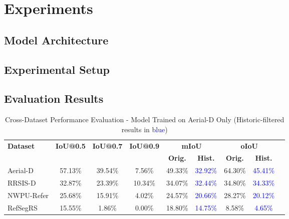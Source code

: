
\section{Experiments}
\label{sec:experiments}

\subsection{Model Architecture}
\label{subsec:model_architecture}

\subsection{Experimental Setup}
\label{subsec:experimental_setup}

\subsection{Evaluation Results}
\label{subsec:evaluation_results}

\begin{table*}[t]
\centering
\caption{Cross-Dataset Performance Evaluation - Model Trained on Aerial-D Only (Historic-filtered results in \textcolor{blue}{blue})}
\label{tab:cross_dataset_results}
\begin{tabular}{@{}lcccccccc@{}}
\toprule
\textbf{Dataset} & \textbf{IoU@0.5} & \textbf{IoU@0.7} & \textbf{IoU@0.9} & \multicolumn{2}{c}{\textbf{mIoU}} & \multicolumn{2}{c}{\textbf{oIoU}} \\
\cmidrule(lr){5-6} \cmidrule(lr){7-8}
 & & & & \textbf{Orig.} & \textbf{Hist.} & \textbf{Orig.} & \textbf{Hist.} \\
\midrule
Aerial-D & 57.13\% & 39.54\% & 7.56\% & 49.33\% & \textcolor{blue}{32.92\%} & 64.30\% & \textcolor{blue}{45.41\%} \\
RRSIS-D & 32.87\% & 23.39\% & 10.34\% & 34.07\% & \textcolor{blue}{32.44\%} & 34.80\% & \textcolor{blue}{34.33\%} \\
NWPU-Refer & 25.68\% & 15.91\% & 4.02\% & 24.57\% & \textcolor{blue}{20.66\%} & 28.27\% & \textcolor{blue}{20.12\%} \\
RefSegRS & 15.55\% & 1.86\% & 0.00\% & 18.80\% & \textcolor{blue}{14.75\%} & 8.58\% & \textcolor{blue}{4.65\%} \\
\bottomrule
\end{tabular}
\end{table*}

